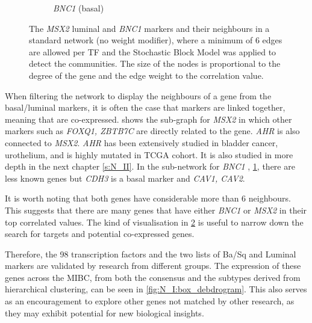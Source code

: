 \begin{figure}[!t]
\begin{subfigure}[!t]{0.49\textwidth}
        \caption{\textit{BNC1} (basal)}
        \label{fig:N_I:net_BNC1}
    \end{subfigure}
    \caption[Network neighbours of \textit{MSX2} and \textit{BNC1}]{The \textit{MSX2} luminal and \textit{BNC1} markers and their neighbours in a standard network (no weight modifier), where a minimum of 6 edges are allowed per TF and the Stochastic Block Model was applied to detect the communities. The size of the nodes is proportional to the degree of the gene and the edge weight to the correlation value.}
    
    \label{fig:N_I:net_neighbours}
\end{figure}

When filtering the network to display the neighbours of a gene from the basal/luminal markers, it is often the case that markers are linked together, meaning that are co-expressed.  shows the sub-graph for \textit{MSX2} in which other markers such as \textit{FOXQ1, ZBTB7C} are directly related to the gene. \textit{AHR} is also connected to \textit{MSX2}. \textit{AHR} has been extensively studied in bladder cancer, urothelium, and is highly mutated in TCGA cohort. It is also studied in more depth in the next chapter \ref{s:N_II}. In the sub-network for \textit{BNC1} , \cref{fig:N_I:net_BNC1}, there are less known genes but \textit{CDH3} is a basal marker \citep{Dadhania2016-cb} and \textit{CAV1, CAV2}. 

It is worth noting that both genes have considerable more than 6 neighbours. This suggests that there are many genes that have either \textit{BNC1} or \textit{MSX2} in their top correlated values. The kind of visualisation in \cref{fig:N_I:net_neighbours} is useful to narrow down the search for targets and potential co-expressed genes.


Therefore, the 98 transcription factors and the two lists of Ba/Sq and Luminal markers are validated by research from different groups. The expression of these genes across the MIBC, from both the consensus and the subtypes derived from hierarchical clustering, can be seen in \cref{fig:N_I:box_debdrogram}. This also serves as an encouragement to explore other genes not matched by other research, as they may exhibit potential for new biological insights.



